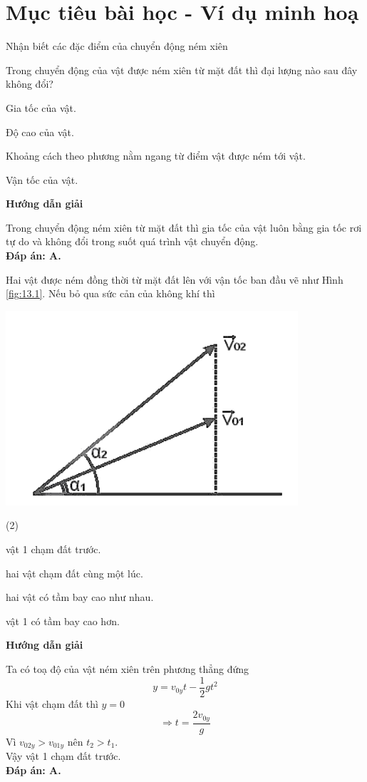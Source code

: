 \section{Mục tiêu bài học - Ví dụ minh hoạ}
\begin{dang}{Nhận biết các đặc điểm của chuyển động ném xiên}
	{Trong chuyển động của vật được ném xiên từ mặt đất thì đại lượng nào sau đây không đổi?
		\begin{mcq}
			\item Gia tốc của vật.
			\item Độ cao của vật.
			\item Khoảng cách theo phương nằm ngang từ điểm vật được ném tới vật.
			\item Vận tốc của vật.
		\end{mcq}
	}
{\begin{center}
		\textbf{Hướng dẫn giải}
	\end{center}
Trong chuyển động ném xiên từ mặt đất thì gia tốc của vật luôn bằng gia tốc rơi tự do và không đổi trong suốt quá trình vật chuyển động.\\
\textbf{Đáp án: A.}
}
{Hai vật được ném đồng thời từ mặt đất lên với vận tốc ban đầu vẽ như Hình \ref{fig:13.1}. Nếu bỏ qua sức cản của không khí thì
	\begin{center}
		\includegraphics[width=0.3\linewidth]{../figs/VN10-2023-PH-TP013-1}
		\label{fig:13.1}
	\end{center}
	\begin{mcq}(2)
		\item vật 1 chạm đất trước.
		\item hai vật chạm đất cùng một lúc.
		\item hai vật có tầm bay cao như nhau.
		\item vật 1 có tầm bay cao hơn.
	\end{mcq}

}
{\begin{center}
		\textbf{Hướng dẫn giải}
	\end{center}
Ta có toạ độ của vật ném xiên trên phương thẳng đứng
$$y=v_{0y}t-\dfrac{1}{2}gt^2$$
Khi vật chạm đất thì $y=0$
$$\Rightarrow t=\dfrac{2v_{0y}}{g}$$
Vì $v_{02y}>v_{01y}$ nên $t_2>t_1$. \\
Vậy vật 1 chạm đất trước.\\
\textbf{Đáp án: A.}

}
\end{dang}
